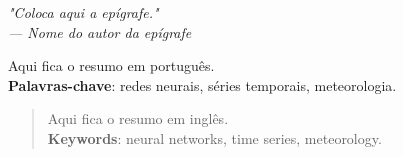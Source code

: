 \documentclass[12pt, openright, a4paper, brazil, oneside]{abntex2}
\begin{document}
    \begin{epigrafe}
        \vspace*{\fill}
        \begin{flushright}
            \textit{
            "Coloca aqui a epígrafe."\\
            --- Nome do autor da epígrafe}
        \end{flushright}
    \end{epigrafe}

    \begin{resumo}
        Aqui fica o resumo em português.\\   
        \textbf{Palavras-chave}: redes neurais, séries temporais, meteorologia.
    \end{resumo}

    \begin{abstract}
        Aqui fica o resumo em inglês.\\ 
        \textbf{Keywords}: neural networks, time series, meteorology.
    \end{abstract}

    \newpage

    \tableofcontents
 

    

    

    

    
    

    \nocite{ipcc2020climate}
    
\end{document}
